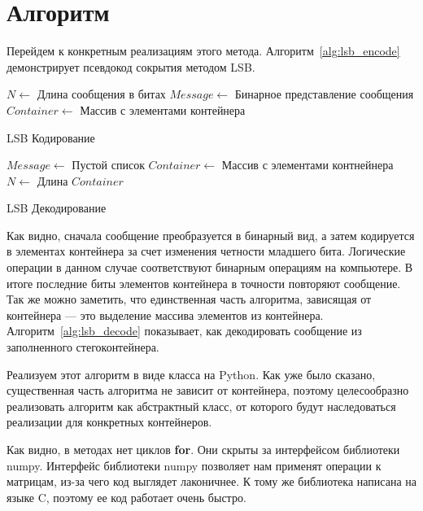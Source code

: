 \section{Алгоритм}
Перейдем к конкретным реализациям этого метода. Алгоритм~\ref{alg:lsb_encode}
демонстрирует псевдокод сокрытия методом LSB.
\begin{algorithm}[ht!]
     $N \leftarrow$ Длина сообщения в битах\;
     $Message \leftarrow$ Бинарное представление сообщения\;
     $Container \leftarrow$ Массив с элементами контейнера\;
     \caption{LSB Кодирование}
    \label{alg:lsb_encode}
\end{algorithm}
\begin{algorithm}[ht!]
    $Message \leftarrow$ Пустой список\;
    $Container \leftarrow$ Массив с элементами контнейнера\;
    $N \leftarrow$ Длина $Container$\;
    \caption{LSB Декодирование}
    \label{alg:lsb_decode}
\end{algorithm}

Как видно, сначала сообщение преобразуется в бинарный вид,
а затем кодируется в элементах контейнера за счет изменения четности младшего бита.
Логические операции в данном случае соответствуют бинарным операциям на компьютере.
В итоге последние биты элементов контейнера в точности повторяют сообщение.
Так же можно заметить, что единственная часть алгоритма, зависящая от контейнера
--- это выделение массива элементов из контейнера. Алгоритм~\ref{alg:lsb_decode}
показывает, как декодировать сообщение из заполненного стегоконтейнера.

Реализуем этот алгоритм в виде класса на Python. Как уже было сказано,
существенная часть алгоритма не зависит от контейнера,
поэтому целесообразно реализовать алгоритм как абстрактный класс,
от которого будут наследоваться реализации для конкретных контейнеров.


Как видно, в методах нет циклов \textbf{for}. Они скрыты за интерфейсом библиотеки numpy.
Интерфейс библиотеки numpy позволяет нам применят операции к матрицам,
из-за чего код выглядет лаконичнее. К тому же библиотека написана на языке C,
поэтому ее код работает очень быстро.

